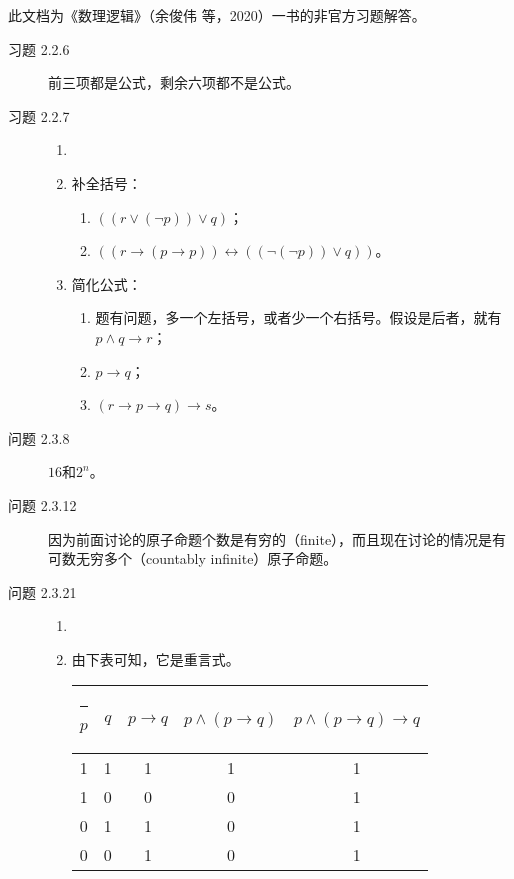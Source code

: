 \documentclass[punct=custom/kaiming,fontset=none]{ctexart}
\title{\Large\bfseries\titleContent}
\title{\bfseries\titleContent}
\author{\authorContent}
\makeatletter
\def\hhline{%
  \noalign{\ifnum0=`}\fi\hrule \@height 2\arrayrulewidth \futurelet
   \reserved@a\@xhline}
\makeatother
\begin{document}
\maketitle

此文档为《数理逻辑》（余俊伟 等，2020）一书的非官方习题解答。

\begin{description}
\item[习题 2.2.6] 前三项都是公式，剩余六项都不是公式。
\item[习题 2.2.7]
  \begin{enumerate}
  \item[]
  \item 补全括号：
    \begin{enumerate}
    \item \(((r \vee (\neg p)) \vee q)\)；
    \item \(((r \to (p \to p)) \leftrightarrow ((\neg(\neg p)) \vee q))\)。
    \end{enumerate}
  \item 简化公式：
    \begin{enumerate}
    \item 题有问题，多一个左括号，或者少一个右括号。假设是后者，就有\(p \wedge q \to r\)；
    \item \(p \to q\)；
    \item \((r \to p \to q) \to s\)。
    \end{enumerate}
  \end{enumerate}
\item[问题 2.3.8] \(16\)和\(2^n\)。
\item[问题 2.3.12] 因为前面讨论的原子命题个数是有穷的（finite），而且现在讨论的情况是有可数无穷多个（countably infinite）原子命题。
\item[问题 2.3.21]
  \begin{enumerate}
  \item[] 
  \item 由下表可知，它是重言式。
    \begin{table}[H]
      \centering
      \begin{tabular}[t]{ccccc}
        \hhline
        \(p\) & \(q\) & \(p \to q\) & \(p \land (p \to q)\) & \(p \land (p \to q) \to q\) \\
        \hline
        1 & 1 & 1 & 1 & 1 \\
        1 & 0 & 0 & 0 & 1 \\
        0 & 1 & 1 & 0 & 1 \\
        0 & 0 & 1 & 0 & 1 \\

\end{tabular}
\end{table}
\end{enumerate}
\end{description}
\end{document}
